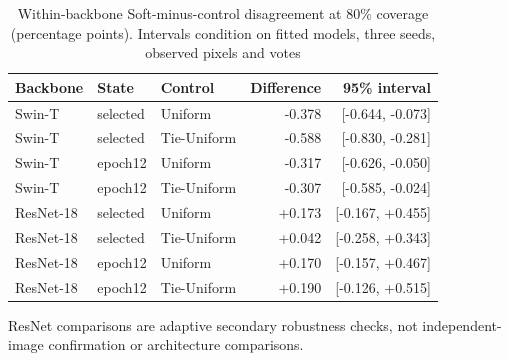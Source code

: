 \begin{table}[t]
\caption{Within-backbone Soft-minus-control disagreement at 80\% coverage (percentage points). Intervals condition on fitted models, three seeds, observed pixels and votes}\label{tab:backbones}
\centering\begin{tabular}{lllrr}\toprule
Backbone & State & Control & Difference & 95\% interval\\\midrule
Swin-T & selected & Uniform & -0.378 & [-0.644, -0.073]\\
Swin-T & selected & Tie-Uniform & -0.588 & [-0.830, -0.281]\\
Swin-T & epoch12 & Uniform & -0.317 & [-0.626, -0.050]\\
Swin-T & epoch12 & Tie-Uniform & -0.307 & [-0.585, -0.024]\\
ResNet-18 & selected & Uniform & +0.173 & [-0.167, +0.455]\\
ResNet-18 & selected & Tie-Uniform & +0.042 & [-0.258, +0.343]\\
ResNet-18 & epoch12 & Uniform & +0.170 & [-0.157, +0.467]\\
ResNet-18 & epoch12 & Tie-Uniform & +0.190 & [-0.126, +0.515]\\
\bottomrule\end{tabular}\par
\smallskip
ResNet comparisons are adaptive secondary robustness checks, not independent-image confirmation or architecture comparisons.\par
\end{table}

